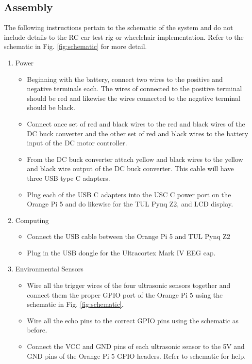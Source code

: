 \documentclass[conference]{IEEEtran}
\begin{document}
    \subsection{Assembly}
    The following instructions pertain to the schematic of the system and do not include details to the RC car test rig or wheelchair implementation. Refer to the schematic in Fig. \ref{fig:schematic} for more detail. 

    \begin{enumerate}
        \item Power
        \begin{itemize}
            \item Beginning with the battery, connect two wires to the positive and negative terminals each. The wires of connected to the positive terminal should be red and likewise the wires connected to the negative terminal should be black.
            \item Connect once set of red and black wires to the red and black wires of the DC buck converter and the other set of red and black wires to the battery input of the DC motor controller.
            \item From the DC buck converter attach yellow and black wires to the yellow and black wire output of the DC buck converter. This cable will have three USB type C adapters.
            \item Plug each of the USB C adapters into the USC C power port on the Orange Pi 5 and do likewise for the TUL Pynq Z2, and LCD display.
        \end{itemize}
        \item Computing
        \begin{itemize}
            \item Connect the USB cable between the Orange Pi 5 and TUL Pynq Z2
            \item Plug in the USB dongle for the Ultracortex Mark IV EEG cap.
        \end{itemize}
        \item Environmental Sensors
        \begin{itemize}
            \item Wire all the trigger wires of the four ultrasonic sensors together and connect them the proper GPIO port of the Orange Pi 5 using the schematic in Fig. \ref{fig:schematic}.
            \item Wire all the echo pins to the correct GPIO pins using the schematic as before.
            \item Connect the VCC and GND pins of each ultrasonic sensor to the 5V and GND pins of the Orange Pi 5 GPIO headers. Refer to schematic for help.

\end{itemize}
\end{enumerate}
\end{document}
